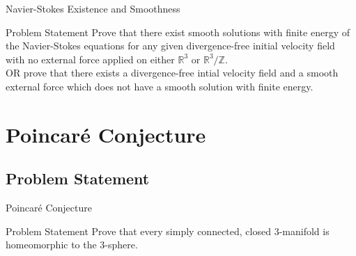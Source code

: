 \documentclass{beamer}
\newcommand{\Poincare}{Poincar\'{e}}
\newcommand{\Real}{\mathbb{R}}
\newcommand{\Integer}{\mathbb{Z}}
\begin{document}
  \begin{frame}{Navier-Stokes Existence and Smoothness}
      \begin{block}{Problem Statement}
          Prove that there exist smooth solutions with finite energy of the
          Navier-Stokes equations for any given divergence-free initial
          velocity field with no external force applied on either $\Real^3$
          or $\Real^3/\Integer$.\pause\\
          OR prove that there exists a divergence-free
          intial velocity field and a smooth external force which does not
          have a smooth solution with finite energy.
      \end{block}
  \end{frame}

  \section{\Poincare{} Conjecture}
  \subsection{Problem Statement}
  \begin{frame}{\Poincare{} Conjecture}
      \begin{block}{Problem Statement}
          Prove that every simply connected, closed 3-manifold is
          homeomorphic to the 3-sphere.
      \end{block}
  \end{frame}
\end{document}
